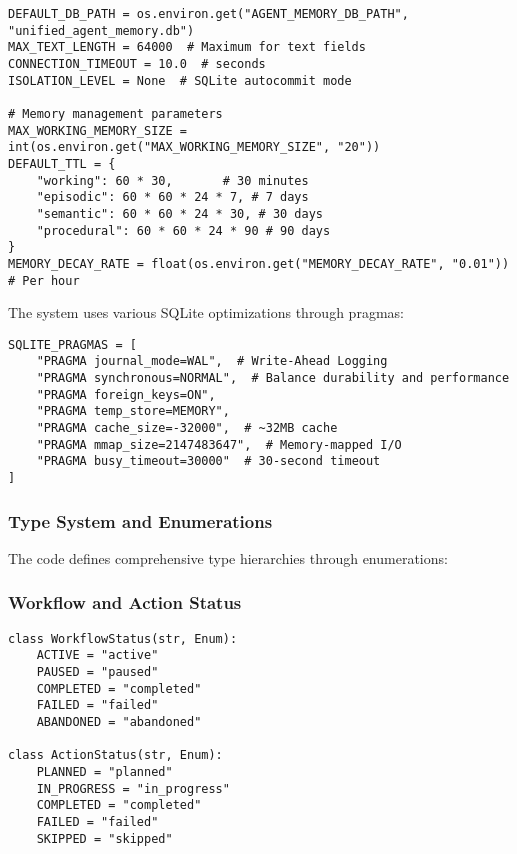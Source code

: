\documentclass[12pt,a4paper]{article}
\begin{document}
\begin{pageablecode}
\begin{verbatim}
DEFAULT_DB_PATH = os.environ.get("AGENT_MEMORY_DB_PATH", "unified_agent_memory.db")
MAX_TEXT_LENGTH = 64000  # Maximum for text fields
CONNECTION_TIMEOUT = 10.0  # seconds
ISOLATION_LEVEL = None  # SQLite autocommit mode

# Memory management parameters
MAX_WORKING_MEMORY_SIZE = int(os.environ.get("MAX_WORKING_MEMORY_SIZE", "20"))
DEFAULT_TTL = {
    "working": 60 * 30,       # 30 minutes
    "episodic": 60 * 60 * 24 * 7, # 7 days
    "semantic": 60 * 60 * 24 * 30, # 30 days
    "procedural": 60 * 60 * 24 * 90 # 90 days
}
MEMORY_DECAY_RATE = float(os.environ.get("MEMORY_DECAY_RATE", "0.01"))  # Per hour
\end{verbatim}
\end{pageablecode}

The system uses various SQLite optimizations through pragmas:

\begin{pageablecode}
\begin{verbatim}
SQLITE_PRAGMAS = [
    "PRAGMA journal_mode=WAL",  # Write-Ahead Logging
    "PRAGMA synchronous=NORMAL",  # Balance durability and performance
    "PRAGMA foreign_keys=ON",
    "PRAGMA temp_store=MEMORY",
    "PRAGMA cache_size=-32000",  # ~32MB cache
    "PRAGMA mmap_size=2147483647",  # Memory-mapped I/O
    "PRAGMA busy_timeout=30000"  # 30-second timeout
]
\end{verbatim}
\end{pageablecode}

\subsubsection*{Type System and Enumerations}

The code defines comprehensive type hierarchies through enumerations:

\subsubsection*{Workflow and Action Status}
\begin{pageablecode}
\begin{verbatim}
class WorkflowStatus(str, Enum):
    ACTIVE = "active"
    PAUSED = "paused"
    COMPLETED = "completed"
    FAILED = "failed"
    ABANDONED = "abandoned"

class ActionStatus(str, Enum):
    PLANNED = "planned"
    IN_PROGRESS = "in_progress"
    COMPLETED = "completed"
    FAILED = "failed"
    SKIPPED = "skipped"
\end{verbatim}
\end{pageablecode}
\end{document}
